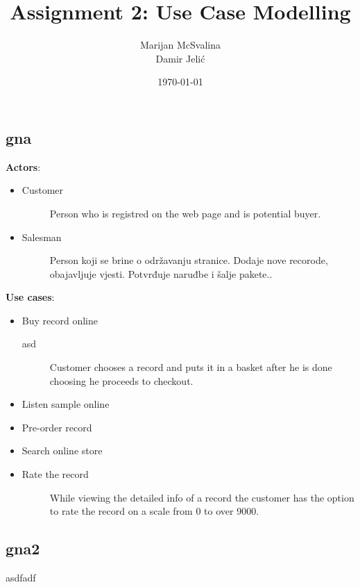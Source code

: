 \documentclass[12pt, titlepage]{article}
\title{Assignment 2: Use Case Modelling}
\date{\today}
\author{Marijan McSvalina \\ Damir Jelić}
\begin{document}
\maketitle 

\setcounter{section}{2}
\subsection{gna}
{\bf Actors}:
\begin{itemize}
\item
    Customer
    \begin{description}
    \item[]Person who is registred on the web page and is potential buyer.
    \end{description}
\item
    Salesman
    \begin{description}
    \item[]Person koji se brine o održavanju stranice. Dodaje nove recorode, obajavljuje vjesti. Potvrđuje naruđbe i šalje pakete..
    \end{description}
\end{itemize}
{\bf Use cases}:
\begin{itemize}
\item
    Buy record online
    \begin{description}
    \item[asd]
   Customer chooses a record and puts it in a basket after he is done choosing he proceeds to checkout.
    \end{description}
\item
    Listen sample online
\item
    Pre-order record
\item 
    Search online store
\item 
    Rate the record
    \begin{description}
    \item[] While viewing the detailed info of a record the customer has the option to rate
    the record on a scale from 0 to over 9000.
    \end{description}
\end{itemize}
\subsection{gna2}
asdfadf
\end{document}
